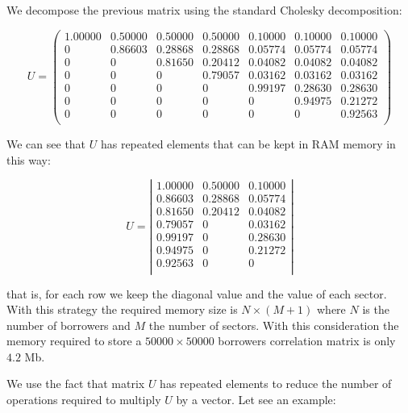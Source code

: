 \documentclass[a4paper,12pt,final]{article}
\begin{document}
We decompose the previous matrix using the standard Cholesky decomposition:

\begin{displaymath}
U = \left(
\begin{array}{cccc|ccc}
 1.00000 & 0.50000 & 0.50000 & 0.50000 & 0.10000 & 0.10000 & 0.10000 \\
 0       & 0.86603 & 0.28868 & 0.28868 & 0.05774 & 0.05774 & 0.05774 \\
 0       & 0       & 0.81650 & 0.20412 & 0.04082 & 0.04082 & 0.04082 \\
 0       & 0       & 0       & 0.79057 & 0.03162 & 0.03162 & 0.03162 \\
\hline
 0       & 0       & 0       & 0       & 0.99197 & 0.28630 & 0.28630 \\
 0       & 0       & 0       & 0       & 0       & 0.94975 & 0.21272 \\
 0       & 0       & 0       & 0       & 0       & 0       & 0.92563 \\
\end{array}
\right)
\end{displaymath}

We can see that $U$ has repeated elements that can be kept in RAM memory in 
this way:

\begin{displaymath}
U = \left|
\begin{array}{c|cc}
 1.00000 & 0.50000 & 0.10000 \\
 0.86603 & 0.28868 & 0.05774 \\
 0.81650 & 0.20412 & 0.04082 \\
 0.79057 & 0       & 0.03162 \\
 0.99197 & 0       & 0.28630 \\
 0.94975 & 0       & 0.21272 \\
 0.92563 & 0       & 0       \\
\end{array}
\right|
\end{displaymath}

that is, for each row we keep the diagonal value and the value of each sector. 
With this strategy the required memory size is $N \times (M+1)$ where $N$ is
the number of borrowers and $M$ the number of sectors. With this consideration
the memory required to store a $50000 \times 50000$ borrowers correlation matrix
is only $4.2$ Mb.
\newline

We use the fact that matrix $U$ has repeated elements to reduce the number of 
operations required to multiply $U$ by a vector. Let see an example:
\end{document}

